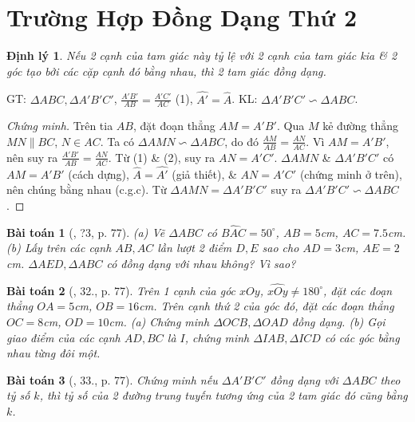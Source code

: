 \documentclass{article}
\newtheorem{baitoan}{Bài toán}
\newtheorem{dinhly}{Định lý}
\begin{document}

\section{Trường Hợp Đồng Dạng Thứ 2}

\begin{dinhly}
	Nếu 2 cạnh của tam giác này tỷ lệ với 2 cạnh của tam giác kia \& 2 góc tạo bởi các cặp cạnh đó bằng nhau, thì 2 tam giác đồng dạng.
\end{dinhly}
GT: $\Delta ABC,\Delta A'B'C'$, $\frac{A'B'}{AB} = \frac{A'C'}{AC}$ (1), $\widehat{A'} = \widehat{A}$. KL: $\Delta A'B'C'\backsim\Delta ABC$.

\begin{proof}[Chứng minh]
	Trên tia $AB$, đặt đoạn thẳng $AM = A'B'$. Qua $M$ kẻ đường thẳng $MN\parallel BC$, $N\in AC$. Ta có $\Delta AMN\backsim\Delta ABC$, do đó $\frac{AM}{AB} = \frac{AN}{AC}$. Vì $AM = A'B'$, nên suy ra $\frac{A'B'}{AB} = \frac{AN}{AC}$. Từ (1) \& (2), suy ra $AN = A'C'$. $\Delta AMN$ \& $\Delta A'B'C'$ có $AM = A'B'$ (cách dựng), $\widehat{A} = \widehat{A'}$ (giả thiết), \& $AN = A'C'$ (chứng minh ở trên), nên chúng bằng nhau (c.g.c). Từ $\Delta AMN = \Delta A'B'C'$ suy ra $\Delta A'B'C'\backsim\Delta ABC$.
\end{proof}

\begin{baitoan}[\cite{SGK_Toan_8_tap_2}, ?3, p. 77]
	(a) Vẽ $\Delta ABC$ có $\widehat{BAC} = 50^\circ$, $AB = 5$\emph{cm}, $AC = 7.5$\emph{cm}. (b) Lấy trên các cạnh $AB,AC$ lần lượt 2 điểm $D,E$ sao cho $AD = 3$\emph{cm}, $AE = 2$\emph{cm}. $\Delta AED,\Delta ABC$ có đồng dạng với nhau không? Vì sao?
\end{baitoan}

\begin{baitoan}[\cite{SGK_Toan_8_tap_2}, 32., p. 77]
	Trên 1 cạnh của góc $xOy$, $\widehat{xOy}\ne180^\circ$, đặt các đoạn thẳng $OA = 5$\emph{cm}, $OB = 16$\emph{cm}. Trên cạnh thứ 2 của góc đó, đặt các đoạn thẳng $OC = 8$\emph{cm}, $OD = 10$\emph{cm}. (a) Chứng minh $\Delta OCB,\Delta OAD$ đồng dạng. (b) Gọi giao điểm của các cạnh $AD,BC$ là $I$, chứng minh $\Delta IAB,\Delta ICD$ có các góc bằng nhau từng đôi một.
\end{baitoan}

\begin{baitoan}[\cite{SGK_Toan_8_tap_2}, 33., p. 77]
	Chứng minh nếu $\Delta A'B'C'$ đồng dạng với $\Delta ABC$ theo tỷ số $k$, thì tỷ số của 2 đường trung tuyến tương ứng của 2 tam giác đó cũng bằng $k$.
\end{baitoan}
\end{document}
